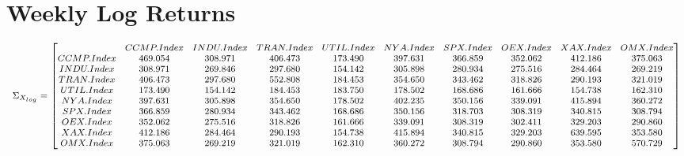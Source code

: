 \documentclass{article}
\begin{document}
\section*{Weekly Log Returns}
\begin{equation*}
\begin{medsize}
\Sigma_{X_{log}}=%
\begin{bmatrix}{}
  & CCMP.Index & INDU.Index & TRAN.Index & UTIL.Index & NYA.Index & SPX.Index & OEX.Index & XAX.Index & OMX.Index \\ 
 CCMP.Index & 469.054 & 308.971 & 406.473 & 173.490 & 397.631 & 366.859 & 352.062 & 412.186 & 375.063 \\ 
  INDU.Index & 308.971 & 269.846 & 297.680 & 154.142 & 305.898 & 280.934 & 275.516 & 284.464 & 269.219 \\ 
  TRAN.Index & 406.473 & 297.680 & 552.808 & 184.453 & 354.650 & 343.462 & 318.826 & 290.193 & 321.019 \\ 
  UTIL.Index & 173.490 & 154.142 & 184.453 & 183.750 & 178.502 & 168.686 & 161.666 & 154.738 & 162.310 \\ 
  NYA.Index & 397.631 & 305.898 & 354.650 & 178.502 & 402.235 & 350.156 & 339.091 & 415.894 & 360.272 \\ 
  SPX.Index & 366.859 & 280.934 & 343.462 & 168.686 & 350.156 & 318.703 & 308.319 & 340.815 & 308.794 \\ 
  OEX.Index & 352.062 & 275.516 & 318.826 & 161.666 & 339.091 & 308.319 & 302.411 & 329.203 & 290.860 \\ 
  XAX.Index & 412.186 & 284.464 & 290.193 & 154.738 & 415.894 & 340.815 & 329.203 & 639.595 & 353.580 \\ 
  OMX.Index & 375.063 & 269.219 & 321.019 & 162.310 & 360.272 & 308.794 & 290.860 & 353.580 & 570.729 \\ 
  \end{bmatrix}
\end{medsize}
\end{equation*}
\end{document}
